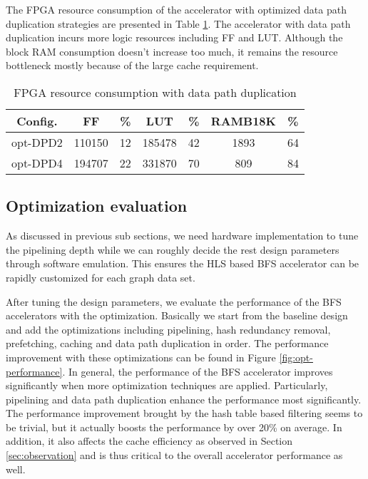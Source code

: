 The FPGA resource consumption of the accelerator with optimized data path duplication 
strategies are presented in Table \ref{tab:duplicate-resource}. The accelerator 
with data path duplication incurs more logic resources including FF and LUT. 
Although the block RAM consumption doesn't increase too much, it remains the 
resource bottleneck mostly because of the large cache requirement.

\begin{table}
  \caption{FPGA resource consumption with data path duplication}
  \label{tab:duplicate-resource}
    \centering
  \begin{tabular}{ccccccc}
    \toprule
      Config. & FF & \% & LUT & \% & RAMB18K & \% \\
    \midrule
      opt-DPD2  & 110150 & 12 & 185478 & 42 & 1893  & 64 \\
      opt-DPD4  & 194707 & 22 & 331870 & 70 & 809  & 84 \\
  \bottomrule
\end{tabular}
\end{table}

\subsection{Optimization evaluation}
As discussed in previous sub sections, we need hardware implementation 
to tune the pipelining depth while we can roughly decide the rest 
design parameters through software emulation. This ensures the HLS based 
BFS accelerator can be rapidly customized for each graph data set.

After tuning the design parameters, we evaluate the 
performance of the BFS accelerators with the optimization. 
Basically we start from the baseline design and 
add the optimizations including pipelining, hash redundancy removal, 
prefetching, caching and data path duplication in order. The performance improvement 
with these optimizations can be found in Figure \ref{fig:opt-performance}. 
In general, the performance of the BFS accelerator improves 
significantly when more optimization techniques are applied. Particularly,
pipelining and data path duplication enhance the performance most 
significantly. The performance improvement brought by the hash table based filtering 
seems to be trivial, but it actually boosts the performance by over 20\% on average. 
In addition, it also affects the cache efficiency as observed in Section \ref{sec:observation}
and is thus critical to the overall accelerator performance as well.

